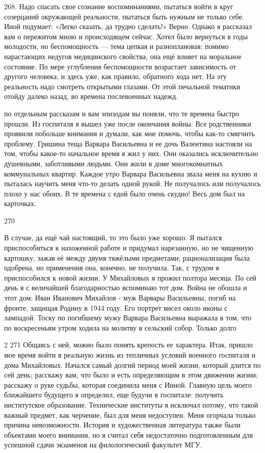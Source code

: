 268. Надо спасать свое сознание воспоминаниями, пытаться войти в круг созерцаний окружающей реальности, пытаться быть нужным не только себе. Иной подумает: «Легко сказать, да трудно сделать!» Верно. Однако я рассказал вам о пережитом мною и происходящем сейчас. Хотел было вернуться в годы молодости, но беспомощность — тема цепкая и разноплановая: помимо нарастающих недугов медицинского свойства, она ещё влияет на моральное состояние. По мере углубления беспомощности возрастает зависимость от другого человека; и здесь уже, как правило, обратного хода нет. На эту реальность надо смотреть открытыми глазами. От этой печальной тематики отойду далеко назад, во времена послевоенных надежд.

по отдельным рассказам и вам эпизодам вы поняли, что те времена быстро прошли. Из госпиталя я вышел уже после окончания войны. Все родственники проявили побольше внимания и думали, как мне помочь, чтобы как-то смягчить проблему. Гришина теща Варвара Васильевна и ее дочь Валентина настояли на том, чтобы какое-то начальное время я жил у них. Они оказались исключительно душевными, заботливыми людьми. Они жили в доме многокомнатных коммунальных квартир. Каждое утро Варвара Васильевна звала меня на кухню и пыталась научить меня что-то делать одной рукой. Не получалось или получалось плохо у нас обоих. В те времена с едой было очень скудно! Весь дом был на карточках.

270

В случае, да ещё чай настоящий, то это было уже хорошо. Я пытался приспособиться к нахоженной работе и придумал нарезанную, но не чищенную картошку, зажав её между двумя тяжёлыми предметами; рационализация была одобрена, но применения она, конечно, не получила. Так, с трудом я приспособился к новой жизни. У Михайловых я прожил полтора месяца. По сей день я с величайшей благодарностью вспоминаю тот дом. Война не обошла и этот дом: Иван Иванович Михайлов - муж Варвары Васильевны, погиб на фронте, защищая Родину в 1944 году. Его портрет висел около иконы с лампадой. Тоску по погибшему мужу Варвара Васильевна выражала в том, что по воскресеньям утром ходила на молитву в сельский собор. Только долго

2
271
Общаясь с ней, можно было понять крепость ее характера.
Итак, пришло мое время войти в реальную жизнь из тепличных условий военного госпиталя и дома Михайловых.
Начался самый долгий период моей жизни, который длится по сей день; расскажу вам, что было и есть определяющим в этом движении жизни; расскажу о руке судьбы, которая соединила меня с Инной.
Главную цель моего ближайшего будущего я определил, еще будучи в госпитале: получить институтское образование. Технические институты я исключал потому, что такой важный предмет, как черчение, был для меня недоступен. Меня огорчала только причина невозможности.
История и художественная литература также были объектами моего внимания, но я считал себя недостаточно подготовленным для успешной сдачи экзаменов на филологический факультет МГУ.

